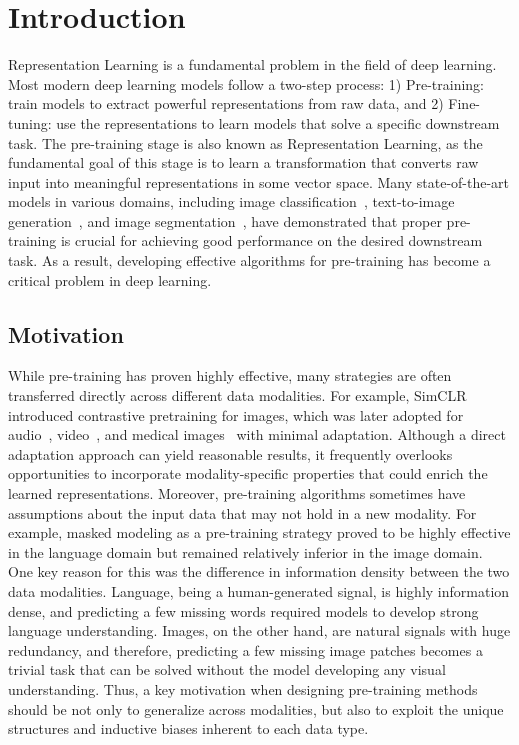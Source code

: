 \section{Introduction}
\label{sec:intro}

Representation Learning is a fundamental problem in the field of deep learning. Most modern deep learning models follow a two-step process: 1) Pre-training: train models to extract powerful representations from raw data, and 2) Fine-tuning: use the representations to learn models that solve a specific downstream task. The pre-training stage is also known as Representation Learning, as the fundamental goal of this stage is to learn a transformation that converts raw input into meaningful representations in some vector space. Many state-of-the-art models in various domains, including image classification~\cite{oquab2024dinov2}, text-to-image generation~\cite{ramesh2022hierarchical}, and image segmentation~\cite{oquab2024dinov2}, have demonstrated that proper pre-training is crucial for achieving good performance on the desired downstream task. As a result, developing effective algorithms for pre-training has become a critical problem in deep learning. 

\subsection{Motivation}
While pre-training has proven highly effective, many strategies are often transferred directly across different data modalities. For example, SimCLR~\cite{chen2020simple} introduced contrastive pretraining for images, which was later adopted for audio~\cite{elizalde2023clap}, video~\cite{sun2022long}, and medical images~\cite{wang2022medclip} with minimal adaptation. Although a direct adaptation approach can yield reasonable results, it frequently overlooks opportunities to incorporate modality-specific properties that could enrich the learned representations. Moreover, pre-training algorithms sometimes have assumptions about the input data that may not hold in a new modality. For example, masked modeling as a pre-training strategy proved to be highly effective in the language domain but remained relatively inferior in the image domain. One key reason for this was the difference in information density between the two data modalities. Language, being a human-generated signal, is highly information dense, and predicting a few missing words required models to develop strong language understanding. Images, on the other hand, are natural signals with huge redundancy, and therefore, predicting a few missing image patches becomes a trivial task that can be solved without the model developing any visual understanding. Thus, a key motivation when designing pre-training methods should be not only to generalize across modalities, but also to exploit the unique structures and inductive biases inherent to each data type.%

